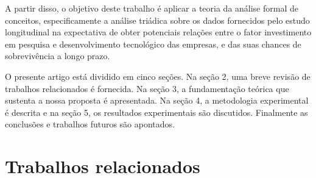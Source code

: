 \documentclass[kdmile,a4paper]{kdmile} %
\begin{document}
A partir disso, o objetivo deste trabalho é aplicar a teoria da análise formal de conceitos, especificamente a análise triádica sobre os dados fornecidos pelo estudo longitudinal \cite{KIM2019103967} na expectativa de obter potenciais relações entre o fator investimento em pesquisa e desenvolvimento tecnológico das empresas, e das suas chances de sobrevivência a longo prazo.

O presente artigo está dividido em cinco seções. Na seção 2, uma breve revisão de trabalhos relacionados é fornecida. Na seção 3, a fundamentação teórica que sustenta a nossa proposta é apresentada. Na seção 4, a metodologia experimental é descrita e na seção 5, os resultados experimentais são discutidos. Finalmente as conclusões e trabalhos futuros são apontados.


\section{Trabalhos relacionados} \label{sec:firstpage}



\end{document}
